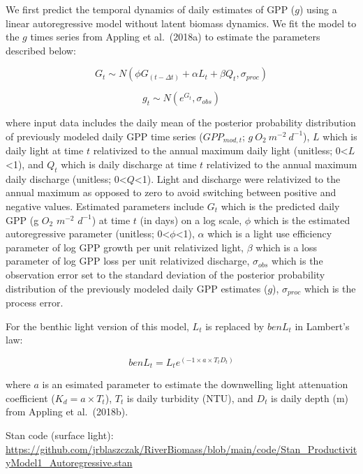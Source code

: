 \documentclass[
]{article}
\begin{document}
We first predict the temporal dynamics of daily estimates of GPP (\(g\))
using a linear autoregressive model without latent biomass dynamics. We
fit the model to the \(g\) times series from Appling et al.~(2018a) to
estimate the parameters described below:

\begin{equation} 
G_{t} \sim N(\phi G_{(t-\Delta t)}+\alpha L_{t}+\beta Q_{t}, \sigma_{proc})
\end{equation}

\begin{equation} 
g_{t} \sim N(e^{G_{t}},\sigma_{obs})
\end{equation}

where input data includes the daily mean of the posterior probability
distribution of previously modeled daily GPP time series
(\(GPP_{mod,t}\); \(g\ O_{2}\ m^{-2}\ d^{-1}\)), \(L\) which is daily
light at time \(t\) relativized to the annual maximum daily light
(unitless; 0\textless{}\(L\)\textless1), and \(Q_t\) which is daily
discharge at time \(t\) relativized to the annual maximum daily
discharge (unitless; 0\textless{}\(Q\)\textless1). Light and discharge
were relativized to the annual maximum as opposed to zero to avoid
switching between positive and negative values. Estimated parameters
include \(G_{t}\) which is the predicted daily GPP (g \(O_2\) \(m^{-2}\)
\(d^{-1}\)) at time \(t\) (in days) on a log scale, \(\phi\) which is
the estimated autoregressive parameter (unitless;
0\textless{}\(\phi\)\textless1), \(\alpha\) which is a light use
efficiency parameter of log GPP growth per unit relativized light,
\(\beta\) which is a loss parameter of log GPP loss per unit relativized
discharge, \(\sigma_{obs}\) which is the observation error set to the
standard deviation of the posterior probability distribution of the
previously modeled daily GPP estimates (\(g\)), \(\sigma_{proc}\) which
is the process error.

For the benthic light version of this model, \(L_t\) is replaced by
\(benL_t\) in Lambert's law:

\begin{equation}
benL_{t} = L_{t}e^{(-1 \times a \times T_{t} D_{t})}
\end{equation}

where \(a\) is an esimated parameter to estimate the downwelling light
attenuation coefficient (\(K_d = a \times T_{t}\)), \(T_t\) is daily
turbidity (NTU), and \(D_t\) is daily depth (m) from Appling et
al.~(2018b).

Stan code (surface light):
\url{https://github.com/jrblaszczak/RiverBiomass/blob/main/code/Stan_ProductivityModel1_Autoregressive.stan}
\end{document}
